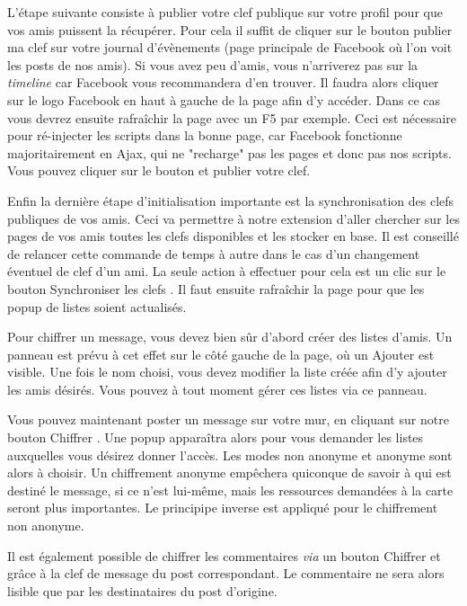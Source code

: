 \documentclass[a4paper,10pt]{article}
\begin{document}
L'étape suivante consiste à publier votre clef publique sur votre profil pour
que vos amis puissent la récupérer. Pour cela il suffit de cliquer sur le bouton
\og publier ma clef \fg{} sur votre journal d'évènements (page principale de Facebook où
l'on voit les posts de nos amis). Si vous avez peu d'amis, vous n'arriverez pas 
sur la \emph{timeline} car Facebook vous recommandera d'en trouver. Il faudra
alors cliquer sur le logo Facebook en haut à gauche de la page afin d'y accéder. 
Dans ce cas vous devrez ensuite rafraîchir la page avec un F5 par exemple. Ceci
est nécessaire pour ré-injecter les scripts dans la bonne page, car Facebook 
fonctionne majoritairement en Ajax, qui ne "recharge" pas les pages et donc pas
nos scripts. Vous pouvez cliquer sur le bouton et publier votre clef.

Enfin la dernière étape d'initialisation importante est la synchronisation des clefs
publiques de vos amis. Ceci va permettre à notre extension d'aller chercher sur les
pages de vos amis toutes les clefs disponibles et les stocker en base. Il est 
conseillé de relancer cette commande de temps à autre dans le cas d'un changement 
éventuel de clef d'un ami. La seule action à effectuer pour cela est un clic sur 
le bouton \og Synchroniser les clefs \fg{}. Il faut ensuite rafraîchir la page
pour que les popup de listes soient actualisés.

Pour chiffrer un message, vous devez bien sûr d'abord créer des listes d'amis. 
Un panneau est prévu à cet effet sur le côté gauche de la page, où un 
\og Ajouter \fg{} est visible. Une fois le nom choisi, vous devez modifier la liste
créée afin d'y ajouter les amis désirés. Vous pouvez à tout moment gérer ces listes 
via ce panneau. 

Vous pouvez maintenant poster un message sur votre mur, en cliquant sur notre bouton
\og Chiffrer \fg{}. Une popup apparaîtra alors pour vous demander les listes auxquelles
vous désirez donner l'accès. Les modes \og non anonyme \fg{} et \og anonyme \fg{} sont 
alors à choisir. Un chiffrement anonyme empêchera quiconque de savoir à qui est destiné
le message, si ce n'est lui-même, mais les ressources demandées à la carte seront plus
importantes. Le principipe inverse est appliqué pour le chiffrement non anonyme.

Il est également possible de chiffrer les commentaires \emph{via} un bouton 
\og Chiffrer \fg{} et grâce à la clef de message du post correspondant. Le commentaire
ne sera alors lisible que par les destinataires du post d'origine.
\end{document}
